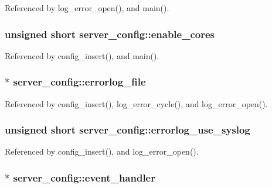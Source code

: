 Referenced by log\-\_\-error\-\_\-open(), and main().

\hypertarget{structserver__config_a7aea773133ad2644b719803a831b462e}{
\subsubsection[{enable\-\_\-cores}]{\setlength{\rightskip}{0pt plus 5cm}unsigned short server\-\_\-config\-::enable\-\_\-cores}}\label{structserver__config_a7aea773133ad2644b719803a831b462e}


Referenced by config\-\_\-insert(), and main().

\hypertarget{structserver__config_a82fb5aa6eae597e14012a95f1b1a6179}{
\subsubsection[{errorlog\-\_\-file}]{$\ast$ server\-\_\-config\-::errorlog\-\_\-file}}\label{structserver__config_a82fb5aa6eae597e14012a95f1b1a6179}


Referenced by config\-\_\-insert(), log\-\_\-error\-\_\-cycle(), and log\-\_\-error\-\_\-open().

\hypertarget{structserver__config_a56c87425f923a696ac63d382374d1c38}{
\subsubsection[{errorlog\-\_\-use\-\_\-syslog}]{\setlength{\rightskip}{0pt plus 5cm}unsigned short server\-\_\-config\-::errorlog\-\_\-use\-\_\-syslog}}\label{structserver__config_a56c87425f923a696ac63d382374d1c38}


Referenced by config\-\_\-insert(), and log\-\_\-error\-\_\-open().

\hypertarget{structserver__config_a1b43ba20d0dcd69f6078661c418b4101}{
\subsubsection[{event\-\_\-handler}]{$\ast$ server\-\_\-config\-::event\-\_\-handler}}\label{structserver__config_a1b43ba20d0dcd69f6078661c418b4101}


